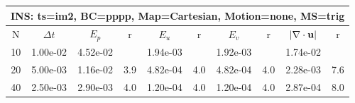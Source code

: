 
\begin{tabular}{|c|c|c|c|c|c|c|c|c|c|} \hline
 \multicolumn{10}{|c|}{INS: ts=im2, BC=pppp, Map=Cartesian, Motion=none, MS=trig } \\ \hline 
     N  &   $\Delta t$ & $E_p$   &  r  &   $E_u$   &   r    &   $E_v$   & r   &  $|\nabla\cdot\mathbf{ u}|$  & r   \\ \hline 
  10   &  1.00e-02  &   4.52e-02  &        &   1.94e-03  &        &   1.92e-03  &        &   1.74e-02  &        \\ 
  20   &  5.00e-03  &   1.16e-02  & 3.9  &   4.82e-04  & 4.0  &   4.82e-04  & 4.0  &   2.28e-03  & 7.6  \\ 
  40   &  2.50e-03  &   2.90e-03  & 4.0  &   1.20e-04  & 4.0  &   1.20e-04  & 4.0  &   2.87e-04  & 8.0  \\ 
 \hline 
\end{tabular}
